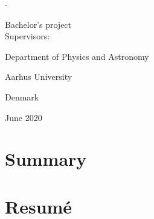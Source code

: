 \begin{titlingpage}
\begin{adjustwidth*}{\frontpagecorrection}{-\frontpagecorrection}
\begin{tikzpicture}[x=0.75pt,y=0.75pt,yscale=-1,xscale=1]
\end{tikzpicture}

			
		\vspace{1cm}
		
		Bachelor's project \\
		Supervisors: 
		\vspace{1.0cm}
		
		\fontsize{13pt}{14pt}\selectfont
		
		Department of Physics and Astronomy\par
		Aarhus University\par
		Denmark
		
		\vspace{0.3cm}
		
		June 2020
		
	\end{adjustwidth*}
\end{titlingpage}



\setcounter{page}{2}

\vspace*{-0.5cm}
\section*{Summary}
\thispagestyle{empty}
 
\vspace{1cm}
\section*{Resumé}

\newpage



